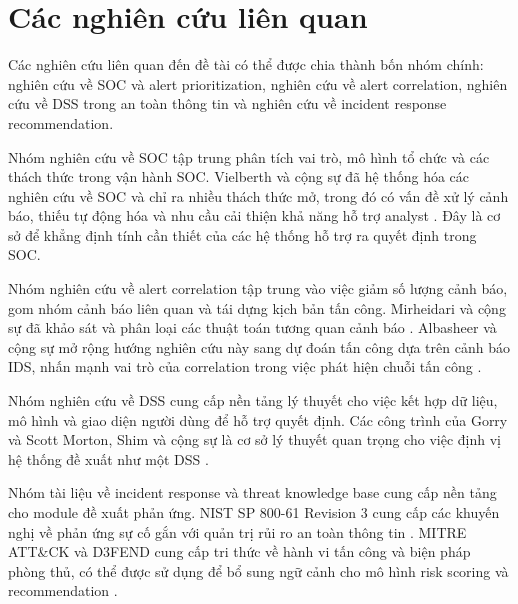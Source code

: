 \documentclass[a4paper,12pt,oneside]{book}
\begin{document}
\section{Các nghiên cứu liên quan}
{\fontsize{13pt}{15.6pt}\selectfont

Các nghiên cứu liên quan đến đề tài có thể được chia thành bốn nhóm chính: nghiên cứu về SOC và alert prioritization, nghiên cứu về alert correlation, nghiên cứu về DSS trong an toàn thông tin và nghiên cứu về incident response recommendation.

\noindent Nhóm nghiên cứu về SOC tập trung phân tích vai trò, mô hình tổ chức và các thách thức trong vận hành SOC. Vielberth và cộng sự đã hệ thống hóa các nghiên cứu về SOC và chỉ ra nhiều thách thức mở, trong đó có vấn đề xử lý cảnh báo, thiếu tự động hóa và nhu cầu cải thiện khả năng hỗ trợ analyst \cite{vielberth2020soc}. Đây là cơ sở để khẳng định tính cần thiết của các hệ thống hỗ trợ ra quyết định trong SOC.

\noindent Nhóm nghiên cứu về alert correlation tập trung vào việc giảm số lượng cảnh báo, gom nhóm cảnh báo liên quan và tái dựng kịch bản tấn công. Mirheidari và cộng sự đã khảo sát và phân loại các thuật toán tương quan cảnh báo \cite{mirheidari2018alert}. Albasheer và cộng sự mở rộng hướng nghiên cứu này sang dự đoán tấn công dựa trên cảnh báo IDS, nhấn mạnh vai trò của correlation trong việc phát hiện chuỗi tấn công \cite{albasheer2022cyber}.

\noindent Nhóm nghiên cứu về DSS cung cấp nền tảng lý thuyết cho việc kết hợp dữ liệu, mô hình và giao diện người dùng để hỗ trợ quyết định. Các công trình của Gorry và Scott Morton, Shim và cộng sự là cơ sở lý thuyết quan trọng cho việc định vị hệ thống đề xuất như một DSS \cite{gorry1971framework,shim2002dss}.

\noindent Nhóm tài liệu về incident response và threat knowledge base cung cấp nền tảng cho module đề xuất phản ứng. NIST SP 800-61 Revision 3 cung cấp các khuyến nghị về phản ứng sự cố gắn với quản trị rủi ro an toàn thông tin \cite{nist80061r3}. MITRE ATT\&CK và D3FEND cung cấp tri thức về hành vi tấn công và biện pháp phòng thủ, có thể được sử dụng để bổ sung ngữ cảnh cho mô hình risk scoring và recommendation \cite{mitreAttack,mitreD3FEND}.

}
\end{document}
